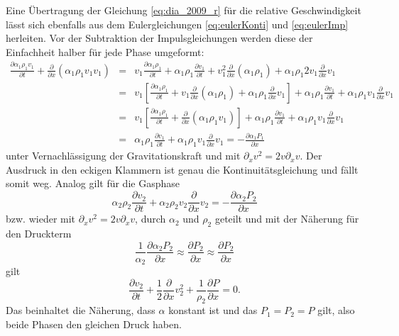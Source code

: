 Eine Übertragung der Gleichung \ref{eq:dia_2009_r} für die relative
Geschwindigkeit lässt sich ebenfalls aus dem Eulergleichungen
\ref{eq:eulerKonti} und \ref{eq:eulerImp} herleiten. Vor der
Subtraktion der Impulsgleichungen werden diese der Einfachheit halber
für jede Phase umgeformt:
\begin{eqnarray}
\frac{\partial \alpha_1 \rho_1 v_1}{\partial t} +
\frac{\partial}{\partial x} (\alpha_1\rho_1 v_1 v_1) &=&
v_1 \frac{\partial \alpha_1 \rho_1}{\partial t} +
\alpha_1 \rho_1 \frac{\partial v_1}{\partial t} +
v_1^2 \frac{\partial}{\partial x} (\alpha_1\rho_1) +
\alpha_1\rho_1 2 v_1\frac{\partial}{\partial x} v_1 \nonumber\\
&=& v_1 \left[\frac{\partial \alpha_1 \rho_1}{\partial t} +
v_1 \frac{\partial}{\partial x} (\alpha_1\rho_1) +
\alpha_1\rho_1 \frac{\partial}{\partial x} v_1\right] +
\alpha_1 \rho_1 \frac{\partial v_1}{\partial t} +
\alpha_1\rho_1 v_1\frac{\partial}{\partial x} v_1\nonumber\\
&=& v_1 \left[\frac{\partial \alpha_1 \rho_1}{\partial t} +
\frac{\partial}{\partial x} (\alpha_1\rho_1 v_1) \right] +
\alpha_1 \rho_1 \frac{\partial v_1}{\partial t} +
\alpha_1\rho_1 v_1\frac{\partial}{\partial x} v_1\nonumber\\
&=& 
\alpha_1 \rho_1 \frac{\partial v_1}{\partial t} +
\alpha_1\rho_1 v_1\frac{\partial}{\partial x} v_1
= - \frac{\partial \alpha_1 P_1}{\partial x} \nonumber
\end{eqnarray}
unter Vernachlässigung der Gravitationskraft und mit $\partial_x v^2 =
2 v\partial_x v $. Der Ausdruck in den eckigen Klammern ist genau die
Kontinuitätsgleichung und fällt somit weg.  Analog gilt für die
Gasphase
\[
\alpha_2 \rho_2 \frac{\partial v_2}{\partial t} +
\alpha_2\rho_2 v_2\frac{\partial}{\partial x} v_2
= - \frac{\partial \alpha_2 P_2}{\partial x} \nonumber
\]
bzw. wieder mit $\partial_x v^2 = 2 v\partial_x v $, durch $\alpha_2$
und $\rho_2$ geteilt und mit der Näherung für den Druckterm
\[
\frac{1}{\alpha_2}\frac{\partial \alpha_2 P_2}{\partial x} \approx
\frac{\partial P_2}{\partial x} \approx \frac{\partial
  P_2}{\partial x}
\]
gilt
\[
\frac{\partial v_2}{\partial t} +
\frac{1}{2}\frac{\partial}{\partial x} v_2^2 +
\frac{1}{\rho_2}\frac{\partial P}{\partial x} = 0.
\]
Das beinhaltet die Näherung, dass $\alpha$ konstant ist und das $P_1 =
P_2 = P$ gilt, also beide Phasen den gleichen Druck haben.

